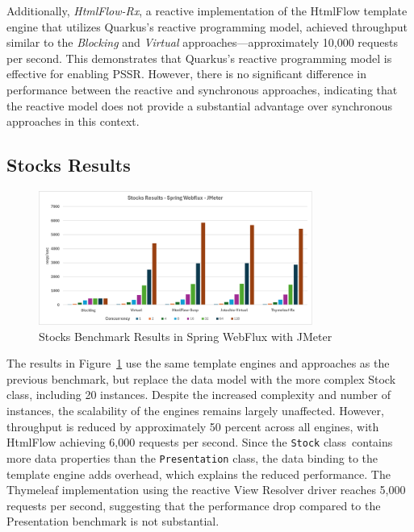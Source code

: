 Additionally, \textit{HtmlFlow-Rx}, a reactive implementation of the HtmlFlow
template engine that utilizes Quarkus's reactive programming model, achieved
throughput similar to the \textit{Blocking} and \textit{Virtual}
approaches—approximately 10,000 requests per second. This demonstrates that
Quarkus's reactive programming model is effective for enabling PSSR\@. However,
there is no significant difference in performance between the reactive and
synchronous approaches, indicating that the reactive model does not provide a
substantial advantage over synchronous approaches in this context.

\subsection{Stocks Results}

\begin{figure}[h]
     \centering
     \includegraphics[width=0.8\textwidth]{./Graphs/stocks-webflux-jmeter.png}
     \caption{Stocks Benchmark Results in Spring WebFlux with JMeter}\label{fig:stocks-webflux-jmeter}
\end{figure}

The results in Figure~\ref{fig:stocks-webflux-jmeter} use the same template
engines and approaches as the previous benchmark, but replace the data model
with the more complex Stock class, including 20 instances. Despite the
increased complexity and number of instances, the scalability of the engines
remains largely unaffected. However, throughput is reduced by approximately 50
percent across all engines, with HtmlFlow achieving 6,000 requests per second.
Since the \texttt{Stock} class\ contains more data properties than the
\texttt{Presentation} class, the data binding to the template engine adds
overhead, which explains the reduced performance. The Thymeleaf implementation
using the reactive View Resolver driver reaches 5,000 requests per second,
suggesting that the performance drop compared to the Presentation benchmark is
not substantial.


